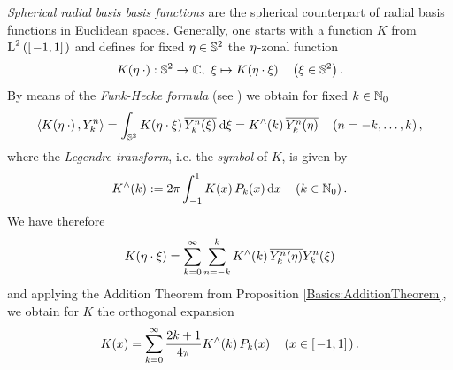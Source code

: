 \documentclass[11pt,a4paper,twoside,bibtotoc]{scrartcl}
\theoremstyle{plain}
\theoremstyle{definition}
\theoremstyle{remark}
\numberwithin{equation}{section}
\numberwithin{table}{section}
\numberwithin{figure}{section}
\begin{document}
\emph{Spherical radial basis basis functions} are the spherical counterpart of radial basis functions in Euclidean spaces. 
Generally, one starts with a function $K$ from $\text{\rm{L}}^{2}\left(\left[\left.-1,1\right]\right.\right)$
and defines for fixed $\mathbf{\eta} \in \mathbb{S}^2$ the $\mathbf{\eta}$-zonal function 
\[
  K{\hspace{-0.4ex}}\left(\mathbf{\eta} \: \cdot\right): \mathbb{S}^2 \rightarrow \mathbb{C},\ \mathbf{\xi} \mapsto K{\hspace{-0.4ex}}\left(\mathbf{\eta} \cdot \mathbf{\xi}\right) \quad \left(\mathbf{\xi} \in \mathbb{S}^2\right).\] 
By means of the \emph{Funk-Hecke formula} (see \cite[pp. 60]{frgesc}) we obtain for fixed $k \in \mathbb{N}_{0}$
\[
  \left<K{\hspace{-0.4ex}}\left(\mathbf{\eta} \: \cdot\right),Y_{k}^n\right> = \int_{\mathbb{S}^2} K{\hspace{-0.4ex}}\left(\mathbf{\eta} \cdot \mathbf{\xi}\right) \overline{Y_{k}^n{\hspace{-0.4ex}}\left(\mathbf{\xi}\right)} \: \text{\rm{d}} \mathbf{\xi} = K^{\wedge}{\hspace{-0.4ex}}\left(k\right) \overline{Y_{k}^n{\hspace{-0.4ex}}\left(\mathbf{\eta}\right)} \quad \left(n=-k,\ldots,k\right),
\]
where the \emph{Legendre transform}, i.e. the \emph{symbol} of $K$, is given by
\[
  K^{\wedge}{\hspace{-0.4ex}}\left(k\right) := 2 \pi \int_{-1}^{1} K{\hspace{-0.4ex}}\left(x\right) P_{k}{\hspace{-0.4ex}}\left(x\right) \text{\rm{d}} x \quad \left(k \in \mathbb{N}_{0}\right).
\]
We have therefore 
\begin{equation}
  \label{Basics:Kernel}
  K{\hspace{-0.4ex}}\left(\mathbf{\eta} \cdot \mathbf{\xi}\right) = \sum_{k = 0}^{\infty} \sum_{n=-k}^k K^{\wedge}{\hspace{-0.4ex}}\left(k\right) \overline{Y_{k}^n{\hspace{-0.4ex}}\left(\mathbf{\eta}\right)} Y_{k}^n{\hspace{-0.4ex}}\left(\mathbf{\xi}\right) 
\end{equation}
and applying the Addition Theorem from Proposition \ref{Basics:AdditionTheorem}, we obtain for $K$ the orthogonal expansion
\begin{equation}
\label{Basics:OrthogonalKernelExpansion}
  K{\hspace{-0.4ex}}\left(x\right) = \sum_{k = 0}^{\infty} \frac{2k+1}{4\pi} K^{\wedge}{\hspace{-0.4ex}}\left(k\right) P_k{\hspace{-0.4ex}}\left(x\right) \quad \left(x \in \left[\left.-1,1\right]\right.\right).
\end{equation}
\end{document}
